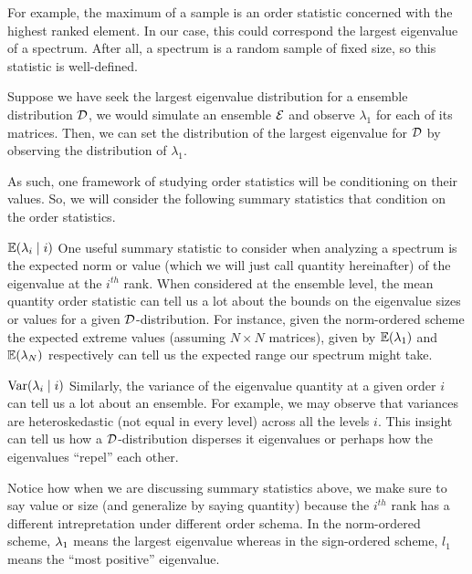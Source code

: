 For example, the maximum of a sample is an order statistic concerned with the highest ranked element.
In our case, this could correspond the largest eigenvalue of a spectrum. After all, a spectrum is a random sample of fixed size, so this statistic is well-defined.

\begin{example}
Suppose we have seek the largest eigenvalue distribution for a ensemble distribution $\mathcal{D}$, we would simulate an ensemble $\mathcal{E}$ and observe $\lambda_1$ for each of its matrices.
Then, we can set the distribution of the largest eigenvalue for $\mathcal{D}$ by observing the distribution of $\lambda_1$.
\end{example}


As such, one framework of studying order statistics will be conditioning on their values. So, we will consider the following summary statistics that condition on the order statistics. \newline


 $\mathbb{E}(\lambda_{i} \mid i)$ One useful summary statistic to consider when analyzing a spectrum is the expected norm or value (which we will just call quantity hereinafter) of the eigenvalue at the $i^{th}$ rank. When considered at the ensemble level, the mean quantity order statistic can tell us a lot about the bounds on the eigenvalue sizes or values for a given $\mathcal{D}$-distribution. For instance, given the norm-ordered scheme the expected extreme values (assuming $N \times N$ matrices), given by $\mathbb{E}(\lambda_1)$ and $\mathbb{E}(\lambda_N)$ respectively can tell us the expected range our spectrum might take. \newline

\medskip

 $\text{Var}(\lambda_{i} \mid i)$ Similarly, the variance of the eigenvalue quantity at a given order $i$ can tell us a lot about an ensemble. For example, we may observe that variances are heteroskedastic (not equal in every level) across all the levels $i$. This insight can tell us how a $\mathcal{D}$-distribution disperses it eigenvalues or perhaps how the eigenvalues ``repel'' each other.

\medskip

\begin{warning}
Notice how when we are discussing summary statistics above, we make sure to say value or size (and generalize by saying quantity) because the $i^{th}$ rank has a different intrepretation under different order schema. In the norm-ordered scheme, $\lambda_1$ means the largest eigenvalue whereas in the sign-ordered scheme, $l_1$ means the ``most positive'' eigenvalue.
\end{warning}

